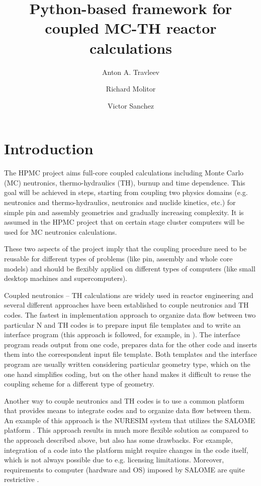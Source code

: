 \documentclass[a4paper,10pt,twocolumn,english]{sphinxsnamc2013}
\title{Python-based framework for coupled MC-TH reactor calculations}
\author[1]{Anton A. Travleev}
\author[1]{Richard Molitor}
\author[1]{Victor Sanchez}
\affil[1]{Institute for Neutron Physics and Reactor Technology (INR), Karlsruhe Institute of Technology,\newline%
Hermann-von-Helmholtz-Platz 1, 76344 Eggenstein-Leopoldshafen}
\begin{document}
\section{Introduction}
\label{paper:introduction}\label{paper::doc}\label{paper:main-entry}
The HPMC project \cite{hpmc} aims full-core coupled calculations
including Monte Carlo (MC) neutronics, thermo-hydraulics (TH), burnup and time dependence.  This goal
will be achieved in steps, starting from coupling two physics domains (e.g.
neutronics and thermo-hydraulics, neutronics and nuclide kinetics, etc.) for
simple pin and assembly geometries and gradually increasing complexity. It is
assumed in the HPMC project that on certain stage cluster computers will be
used for MC neutronics calculations.

These two aspects of the project imply that the coupling procedure need to
be reusable for different types of problems (like pin, assembly and whole core
models) and should be flexibly applied on different types of computers (like
small desktop machines and supercomputers).

Coupled neutronics -- TH calculations are widely used in reactor engineering and several
different approaches have been established to couple neutronics and TH codes. The
fastest in implementation approach to organize data flow between two particular
N and TH codes is to prepare input file templates and to write an interface
program (this approach is followed, for example,  in
\cite{HoogenboomMC2011}).  The interface program reads output from
one code, prepares data for the other code and inserts them into the correspondent
input file template. Both templates and the interface program are usually
written considering particular geometry type, which on the one hand
simplifies coding, but on the other hand makes it difficult to reuse the
coupling scheme for a different type of geometry.

Another way to couple neutronics and TH codes is to use a common platform
that provides means to integrate codes and to organize data flow between
them.  An example of this approach is the NURESIM system
\cite{nuresimICONE2006,nuresimWEB} that utilizes the SALOME
platform \cite{salomeWEB}. This approach results in much more
flexible solution as compared to the approach described above, but also has
some drawbacks. For example, integration of a code into the platform might
require changes in the code itself, which is not always possible due to e.g.
licensing limitations. Moreover, requirements to computer (hardware and OS) imposed by
SALOME are quite restrictive \cite{salomeWEB}.
\end{document}

